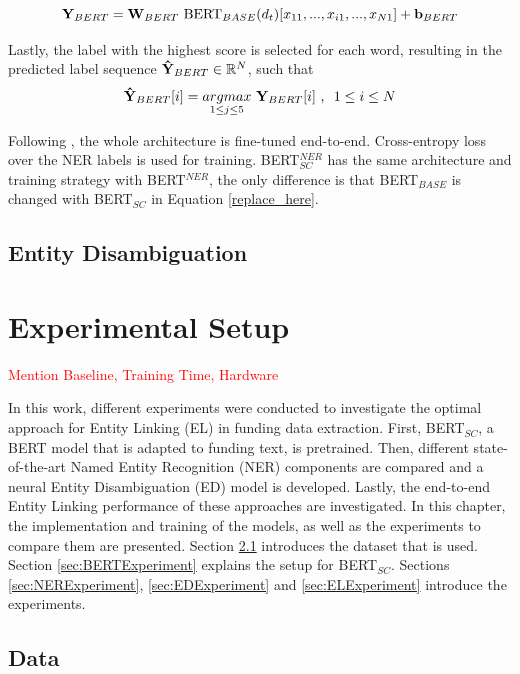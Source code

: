 \documentclass{report}
\theoremstyle{definition}
\theoremstyle{remark}
\begin{document}
\begin{equation}
\label{replace_here}
   \bold{Y}_{BERT} = \bold{W}_{BERT} \ \text{BERT}_{BASE}(d_t)[x_{11},...,x_{i1},...,x_{N1}] + \bold{b}_{BERT}
\end{equation}

Lastly, the label with the highest score is selected for each word, resulting in the predicted label sequence $\bold{\Hat{Y}}_{BERT} \in \mathbb{R}^N$, such that
\begin{equation}
    \bold{\Hat{Y}}_{BERT}[i] = \underset{1\leq j\leq5}{argmax} \ \bold{Y}_{BERT} [i] \ \text{, } \ 1\leq i \leq N 
\end{equation}

Following \cite{BERT}, the whole architecture is fine-tuned end-to-end. Cross-entropy loss over the NER labels is used for training. BERT$^{NER}_{SC}$ has the same architecture and training strategy with BERT$^{NER}$, the only difference is that BERT$_{BASE}$ is changed with BERT$_{SC}$ in Equation \ref{replace_here}.

\section{Entity Disambiguation}

\newpage
\chapter{Experimental Setup}
\textcolor{red}{Mention Baseline, Training Time, Hardware}

In this work, different experiments were conducted to investigate the optimal approach for Entity Linking (EL) in funding data extraction. First, BERT$_{SC}$, a BERT model that is adapted to funding text, is pretrained. Then, different state-of-the-art Named Entity Recognition (NER) components are compared and a neural Entity Disambiguation (ED) model is developed. Lastly, the end-to-end Entity Linking performance of these approaches are investigated. In this chapter, the implementation and training of the models, as well as the experiments to compare them are presented. Section \ref{sec:data} introduces the dataset that is used. Section \ref{sec:BERTExperiment} explains the setup for BERT$_{SC}$. Sections \ref{sec:NERExperiment}, \ref{sec:EDExperiment} and \ref{sec:ELExperiment} introduce the experiments.

\section{Data}
\label{sec:data}
\end{document}
